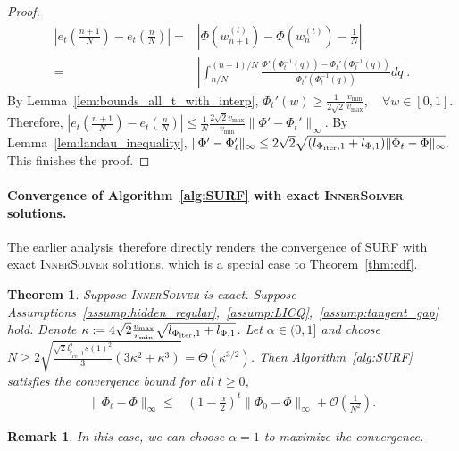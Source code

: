\documentclass{article}
\newtheorem{remark}{Remark}
\newtheorem{theorem}{Theorem}
\newcommand{\Oc}{\mathcal{O}}
\newcommand{\f}{\mathbf{f}}
\newcommand{\Farc}{\Phi}
\begin{document}
\begin{proof}
\begin{align}
\left|e_t\left(\tfrac{n+1}{N}\right)-e_t\left(\tfrac{n}{N}\right)\right|
= &
\left|
\Farc(w_{n+1}^{(t)})-\Farc(w_n^{(t)})-\frac1N
\right|
\nonumber\\
= &
\left|
\int_{n/N}^{(n+1)/N}
\frac{
\Farc'(\Farc_t^{-1}(q))
-
\Farc_t'(\Farc_t^{-1}(q))
}{
\Farc_t'(\Farc_t^{-1}(q))
}
dq
\right|.
\label{eq:et_diff_integral_inline}
\end{align}
By Lemma~\ref{lem:bounds_all_t_with_interp},
$
\Farc_t'(w)\ge \frac{1}{2\sqrt2}\frac{v_{\min}}{v_{\max}},
\quad \forall w\in[0,1].
$
Therefore,
$
\left|e_t\left(\tfrac{n+1}{N}\right)-e_t\left(\tfrac{n}{N}\right)\right|
\le
\frac{1}{N}
\frac{2\sqrt2 v_{\max}}{v_{\min}}
\|\Farc'-\Farc_t'\|_\infty.
$
By Lemma~\ref{lem:landau_inequality},
$
\|\Farc'-\Farc_t'\|_\infty
\le
2\sqrt2
\sqrt{
(l_{\Farc_{\rm iter},1}+l_{\Farc,1})
\|\Farc_t-\Farc\|_\infty
}.
$
This finishes the proof.
\end{proof}
\paragraph{Convergence of Algorithm~\ref{alg:SURF} with exact \textsc{InnerSolver} solutions.} The earlier analysis therefore directly renders the convergence of SURF with exact \textsc{InnerSolver} solutions, which is a special case to Theorem~\ref{thm:cdf}.
\label{appendix:cdf_exact}

\begin{theorem}
\label{thm:CDF_exact_inner_solver}
Suppose \textsc{InnerSolver} is exact. Suppose Assumptions~\ref{assump:hidden_regular},~\ref{assump:LICQ},~\ref{assump:tangent_gap} hold. 
Denote $\kappa := 4\sqrt2\frac{v_{\max}}{v_{\min}} \sqrt{l_{\Farc_{\rm iter},1}+l_{\Farc,1}}$. 
Let $\alpha\in(0,1]$ and choose $N \ge 2 \sqrt{\frac{ \sqrt2 l_{\tilde{\f}_{\mathrm{PF}},1}^2 s(1)^2}{3} \left(3\kappa^2+\kappa^3\right)} = \Theta(\kappa^{3/2})$.
Then Algorithm~\ref{alg:SURF} satisfies the  convergence bound for all $t\ge 0$,
\begin{align}
    \|\Farc_t-\Farc\|_\infty \leq  & \left(1-\frac{\alpha}{2}\right)^t\|\Farc_0-\Farc\|_\infty +\Oc\left(\frac{1}{N^2}\right). \label{eq:exact_convergence}
\end{align}
\end{theorem}
\begin{remark}
 In this case, we can choose $\alpha = 1$ to maximize the convergence.
\end{remark}
\end{document}
